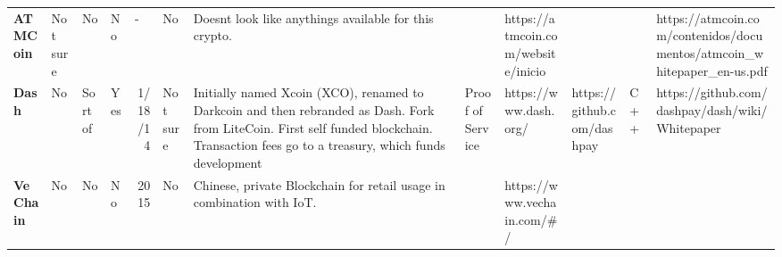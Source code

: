 \begin{table}[htbp]
\begin{adjustbox}{width=25cm, height=6cm, angle=270}
\begin{tabular}{llllrlp{17.915em}rlrrr}
      \rowcolor[rgb]{ .267,  .447,  .769} \textcolor[rgb]{ 1,  1,  1}{\textbf{ATMCoin}} & \cellcolor[rgb]{ 1,  .922,  .612}\textcolor[rgb]{ .612,  .341,  0}{Not sure} & \cellcolor[rgb]{ 1,  .78,  .808}\textcolor[rgb]{ .612,  0,  .024}{No} & \cellcolor[rgb]{ 1,  .78,  .808}\textcolor[rgb]{ .612,  0,  .024}{No} & \multicolumn{1}{l}{\cellcolor[rgb]{ 1,  1,  1}-} & \cellcolor[rgb]{ 1,  .78,  .808}\textcolor[rgb]{ .612,  0,  .024}{No} & \cellcolor[rgb]{ 1,  1,  1}\textcolor[rgb]{ .188,  .329,  .588}{Doesnt look like anythings available for this crypto.} & \cellcolor[rgb]{ 1,  1,  1} & \cellcolor[rgb]{ 1,  1,  1}https://atmcoin.com/website/inicio & \cellcolor[rgb]{ 1,  1,  1} & \cellcolor[rgb]{ 1,  1,  1} & \multicolumn{1}{l}{\cellcolor[rgb]{ 1,  1,  1}https://atmcoin.com/contenidos/documentos/atmcoin\_whitepaper\_en-us.pdf} \\
      \rowcolor[rgb]{ .267,  .447,  .769} \textcolor[rgb]{ 1,  1,  1}{\textbf{Dash}} & \cellcolor[rgb]{ 1,  .78,  .808}\textcolor[rgb]{ .612,  0,  .024}{No} & \cellcolor[rgb]{ 1,  .922,  .612}\textcolor[rgb]{ .612,  .341,  0}{Sort of} & \cellcolor[rgb]{ .776,  .937,  .808}\textcolor[rgb]{ 0,  .38,  0}{Yes} & \cellcolor[rgb]{ .851,  .882,  .949}\textcolor[rgb]{ .188,  .329,  .588}{1/18/14} & \cellcolor[rgb]{ 1,  .922,  .612}\textcolor[rgb]{ .612,  .341,  0}{Not sure} & \cellcolor[rgb]{ .851,  .882,  .949}\textcolor[rgb]{ .188,  .329,  .588}{Initially named Xcoin (XCO), renamed to Darkcoin and then rebranded as Dash. Fork from LiteCoin. First self funded blockchain. Transaction fees go to a treasury, which funds development} & \multicolumn{1}{l}{\cellcolor[rgb]{ .851,  .882,  .949}\textcolor[rgb]{ .188,  .329,  .588}{Proof of Service}} & \cellcolor[rgb]{ .851,  .882,  .949}\textcolor[rgb]{ .188,  .329,  .588}{https://www.dash.org/} & \multicolumn{1}{l}{\cellcolor[rgb]{ .851,  .882,  .949}\textcolor[rgb]{ .188,  .329,  .588}{https://github.com/dashpay}} & \multicolumn{1}{l}{\cellcolor[rgb]{ .851,  .882,  .949}\textcolor[rgb]{ .188,  .329,  .588}{C++}} & \multicolumn{1}{l}{\cellcolor[rgb]{ .851,  .882,  .949}\textcolor[rgb]{ .188,  .329,  .588}{https://github.com/dashpay/dash/wiki/Whitepaper}} \\
      \rowcolor[rgb]{ .267,  .447,  .769} \textcolor[rgb]{ 1,  1,  1}{\textbf{VeChain}} & \cellcolor[rgb]{ 1,  .78,  .808}\textcolor[rgb]{ .612,  0,  .024}{No} & \cellcolor[rgb]{ 1,  .78,  .808}\textcolor[rgb]{ .612,  0,  .024}{No} & \cellcolor[rgb]{ 1,  .78,  .808}\textcolor[rgb]{ .612,  0,  .024}{No} & \cellcolor[rgb]{ 1,  1,  1}\textcolor[rgb]{ .188,  .329,  .588}{2015} & \cellcolor[rgb]{ 1,  .78,  .808}\textcolor[rgb]{ .612,  0,  .024}{No} & \cellcolor[rgb]{ 1,  1,  1}\textcolor[rgb]{ .188,  .329,  .588}{Chinese, private Blockchain for retail usage in combination with IoT.} & \cellcolor[rgb]{ 1,  1,  1}\textcolor[rgb]{ .188,  .329,  .588}{} & \cellcolor[rgb]{ 1,  1,  1}\textcolor[rgb]{ .188,  .329,  .588}{https://www.vechain.com/\#/} & \cellcolor[rgb]{ 1,  1,  1}\textcolor[rgb]{ .188,  .329,  .588}{} & \cellcolor[rgb]{ 1,  1,  1}\textcolor[rgb]{ .188,  .329,  .588}{} & \cellcolor[rgb]{ 1,  1,  1}\textcolor[rgb]{ .188,  .329,  .588}{} \\

\end{tabular}
\end{adjustbox}
\end{table}
